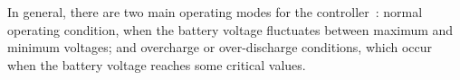 \documentclass[journal]{IEEEtran}
\begin{document}
%
%
%
%
In general, there are two main operating modes for the controller~\cite{Rawat}: normal operating condition, when the battery voltage fluctuates between maximum and minimum voltages; and overcharge or over-discharge conditions, which occur when the battery voltage reaches some critical values. 
\end{document}
